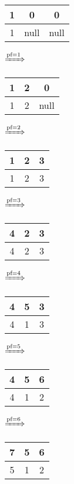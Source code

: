 \documentclass{article}
\begin{document}
\begin{itemize}
            \begin{tabular}{|c|c|c|}
                \hline
                1 & 0 & 0\\
                \hline
                1 & null & null\\
                \hline
            \end{tabular}
            $\xRightarrow{\text{pf}=1}$
            \begin{tabular}{|c|c|c|}
                \hline
                1 & 2 & 0\\
                \hline
                1 & 2 & null\\
                \hline
            \end{tabular}
            $\xRightarrow{\text{pf}=2}$
            \begin{tabular}{|c|c|c|}
                \hline
                1 & 2 & 3\\
                \hline
                1 & 2 & 3\\
                \hline
            \end{tabular}
            $\xRightarrow{\text{pf}=3}$
            \begin{tabular}{|c|c|c|}
                \hline
                4 & 2 & 3\\
                \hline
                4 & 2 & 3\\
                \hline
            \end{tabular}
            $\xRightarrow{\text{pf}=4}$
            \begin{tabular}{|c|c|c|}
                \hline
                4 & 5 & 3\\
                \hline
                4 & 1 & 3\\
                \hline
            \end{tabular}
            $\xRightarrow{\text{pf}=5}$
            \begin{tabular}{|c|c|c|}
                \hline
                4 & 5 & 6\\
                \hline
                4 & 1 & 2\\
                \hline
            \end{tabular}
            $\xRightarrow{\text{pf}=6}$
            \begin{tabular}{|c|c|c|}
                \hline
                7 & 5 & 6\\
                \hline
                5 & 1 & 2\\
                \hline

\end{tabular}
\end{itemize}
\end{document}
